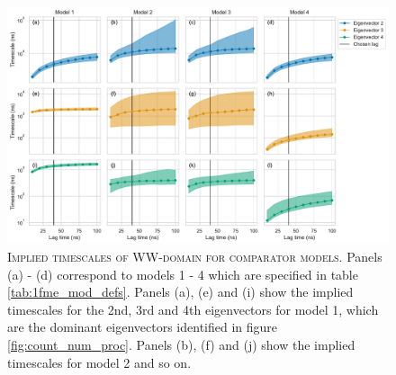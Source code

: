 \documentclass{article}
\begin{document}
\begin{figure}[h]
    \centering
    \includegraphics[width=1\textwidth]{figures/model_comparision_its/gtt.pdf}
    \caption{\textsc{Implied timescales of WW-domain for comparator models.} Panels (a) - (d) correspond to models 1 - 4 which are specified in table \ref{tab:1fme_mod_defs}. Panels (a), (e) and (i) show the implied timescales for the 2nd, 3rd and 4th eigenvectors for model 1, which are the dominant eigenvectors identified in figure \ref{fig:count_num_proc}.  Panels (b), (f) and (j) show the implied timescales for model 2 and so on.}
    \label{fig:gtt_its}
\end{figure}
\end{document}
